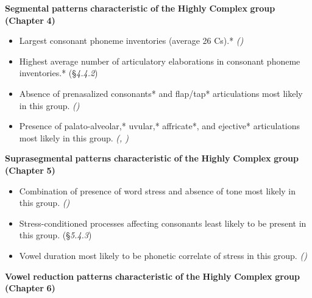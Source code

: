 \textbf{Segmental} \textbf{patterns} \textbf{characteristic} \textbf{of} \textbf{the} \textbf{Highly} \textbf{Complex} \textbf{group} \textbf{(Chapter} \textbf{4)}


\begin{itemize}
\item 
Largest consonant phoneme inventories (average 26 Cs).* \textit{()}

\item 
Highest average number of articulatory elaborations in consonant phoneme inventories.* (§\textit{4.4.2})

\item 
Absence of prenasalized consonants* and flap/tap* articulations most likely in this group. \textit{()}

\item 
Presence of palato-alveolar,* uvular,* affricate*, and ejective* articulations most likely in this group. \textit{(, )}

\end{itemize}

\textbf{Suprasegmental} \textbf{patterns} \textbf{characteristic} \textbf{of} \textbf{the} \textbf{Highly} \textbf{Complex} \textbf{group} \textbf{(Chapter} \textbf{5)}


\begin{itemize}
\item 
Combination of presence of word stress and absence of tone most likely in this group. \textit{()}

\item 
Stress-conditioned processes affecting consonants least likely to be present in this group. (§\textit{5.4.3})

\item 
Vowel duration most likely to be phonetic correlate of stress in this group. \textit{()}

\end{itemize}

\textbf{Vowel} \textbf{reduction} \textbf{patterns} \textbf{characteristic} \textbf{of} \textbf{the} \textbf{Highly} \textbf{Complex} \textbf{group} \textbf{(Chapter} \textbf{6)}


